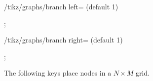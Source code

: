 \begin{key}{/tikz/graphs/branch left= (default 1)}
%
\begin{codeexample}[preamble={\usetikzlibrary{graphs}}]
\tikz {};
\end{codeexample}
%
\end{key}

\begin{key}{/tikz/graphs/branch right= (default 1)}
%
\begin{codeexample}[preamble={\usetikzlibrary{graphs}}]
\tikz {};
\end{codeexample}
%
\end{key}

The following keys place nodes in a $N\times M$ grid.

